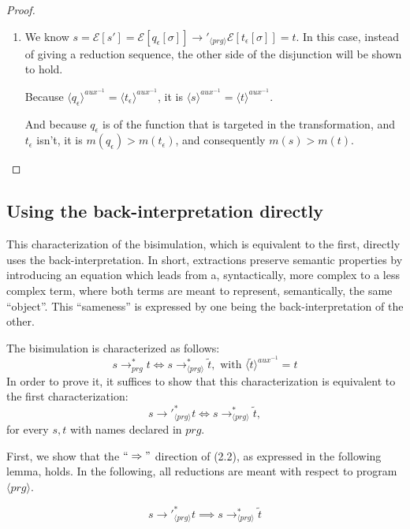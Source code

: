 \begin{proposition}
\begin{proof}
\begin{enumerate}
\item We know $s = \mathcal{E}[s'] = \mathcal{E}[q_\epsilon[\sigma]] \longrightarrow'_{\langle prg \rangle} \mathcal{E}[t_\epsilon[\sigma]] = t$. In this case, instead of giving a reduction sequence, the other side of the disjunction will be shown to hold.

Because $\langle q_\epsilon \rangle^{aux^{-1}} = \langle t_\epsilon \rangle^{aux^{-1}}$, it is $\langle s \rangle^{aux^{-1}} = \langle t \rangle^{aux^{-1}}$.

And because $q_\epsilon$ is of the function that is targeted in the transformation, and $t_\epsilon$ isn't, it is $m(q_\epsilon) > m(t_\epsilon)$, and consequently $m(s) > m(t)$. \qedhere
\end{enumerate}
\end{proof}
\end{proposition}

\subsection{Using the back-interpretation directly}

This characterization of the bisimulation, which is equivalent to the first, directly uses the back-interpretation. In short, extractions preserve semantic properties by introducing an equation which leads from a, syntactically, more complex to a less complex term, where both terms are meant to represent, semantically, the same ``object''. This ``sameness'' is expressed by one being the back-interpretation of the other.

The bisimulation is characterized as follows:
\[
s {\longrightarrow}_{prg}^* t \iff s \longrightarrow^*_{\langle prg \rangle} \widetilde{t}, \text{ with } \langle \widetilde{t} \rangle^{aux^{-1}} = t
\]
In order to prove it, it suffices to show that this characterization is equivalent to the first characterization:
\begin{equation}
s {\longrightarrow'}_{\langle prg \rangle}^* t \iff s \longrightarrow^*_{\langle prg \rangle} \widetilde{t},
\end{equation}
for every $s, t$ with names declared in $prg$.

First, we show that the $`` \Rightarrow "$ direction of (2.2), as expressed in the following lemma, holds. In the following, all reductions are meant with respect to program $\langle prg \rangle$.

\begin{lemma}
\label{lem:prop2lr}
\[
s {\longrightarrow'}_{\langle prg \rangle}^* t \implies s \longrightarrow^*_{\langle prg \rangle} \widetilde{t}
\]
\end{lemma}

